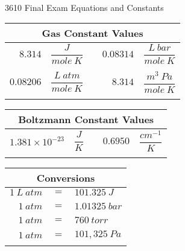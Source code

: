 \documentclass[12pt, letterpaper]{memoir}
\begin{document}
\newpage
\pagestyle{empty}

~
\vspace{-3em}
\begin{center}
	{\LARGE 3610 Final Exam Equations and Constants}
\end{center}

\vspace{-1em}\noindent
\begin{minipage}{0.57\linewidth}
	\begin{mdframed}
		\begin{tabular}{rlcrl}
			\multicolumn{5}{c}{Gas Constant Values}                                       \\ \midrule
			$8.314$   & $\dfrac{J}{mole~K}$     &  & $0.08314$ & $\dfrac{L~bar}{mole~K}$  \\ \\
			$0.08206$ & $\dfrac{L~atm}{mole~K}$ &  & $8.314$   & $\dfrac{m^3~Pa}{mole~K}$ \\ \\
		\end{tabular}
		\begin{tabular}{rlcrl}
			\multicolumn{5}{c}{Boltzmann Constant Values}                                 \\ \midrule
			$1.381 \times 10^{-23}$ & $\dfrac{J}{K}$ &  & $0.6950$ & $\dfrac{cm^{-1}}{K}$ \\ \\
		\end{tabular}
	\end{mdframed}
\end{minipage}
\hspace{20pt}
\begin{minipage}{0.4\linewidth}
	\begin{mdframed}
		\begin{tabular}{rcl}
			\multicolumn{3}{c}{Conversions}  \\ \midrule
			$1~L~atm $ & $=$ & $101.325~J$   \\ \\
			$1~atm $   & $=$ & $1.01325~bar$ \\ \\
			$1~atm $   & $=$ & $760~torr$    \\ \\
			$1~atm $   & $=$ & $101,325~Pa$  \\ \\
		\end{tabular}
	\end{mdframed}
\end{minipage}
\end{document}
